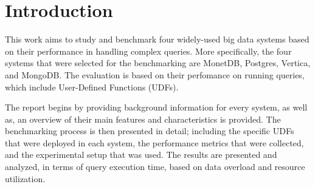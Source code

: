 \section{Introduction}
\label{sec:intro}

This work aims to study and benchmark four widely-used 
big data systems based on their performance in handling
complex queries. More specifically, the four systems
that were selected for the benchmarking are MonetDB, 
Postgres, Vertica, and MongoDB. The evaluation is 
based on their perfomance on running queries, which
include User-Defined Functions (UDFs).

The report begins by providing background information 
for every system, as well as, an overview 
of their main features and characteristics is provided.
The benchmarking process is then presented in detail; 
including the specific UDFs that were deployed in each system, 
the performance metrics that were collected, 
and the experimental setup that was used. 
The results are presented and analyzed, 
in terms of query execution time, 
based on data overload and resource utilization. 

